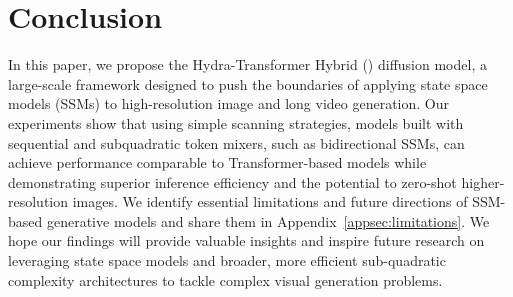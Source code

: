 \section{Conclusion}
\label{sec:conclusion}

In this paper, we propose the Hydra-Transformer Hybrid (\ours{}) diffusion model, a large-scale framework designed to push the boundaries of applying state space models (SSMs) to high-resolution image and long video generation. Our experiments show that using simple scanning strategies, models built with sequential and subquadratic token mixers, such as bidirectional SSMs, can achieve performance comparable to Transformer-based models while demonstrating superior inference efficiency and the potential to zero-shot higher-resolution images. We identify essential limitations and future directions of SSM-based generative models and share them in Appendix~\ref{appsec:limitations}.
We hope our findings will provide valuable insights and inspire future research on leveraging state space models and broader, more efficient sub-quadratic complexity architectures to tackle complex visual generation problems. 

